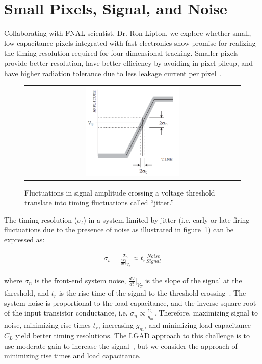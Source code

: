 \section{Small Pixels, Signal, and Noise}
Collaborating with FNAL scientist, Dr. Ron Lipton, we explore whether small, low-capacitance pixels integrated with fast electronics show promise for realizing the timing resolution required for four-dimensional tracking.
Smaller pixels provide better resolution, have better efficiency by avoiding in-pixel pileup, and have higher radiation tolerance due to less leakage current per pixel~\cite{Garcia-Sciveres_2018}.

\begin{figure}[htb]
  \begin{center}
    \begin{tabular}{c}
        \includegraphics[width=0.45\textwidth]{fig_FastTiming/Jitter.png}
    \end{tabular}
    \caption{Fluctuations in signal amplitude crossing a voltage threshold translate into timing fluctuations called ``jitter.''
            }            
    \label{Jitter}
  \end{center}
\end{figure}
The timing resolution ($\sigma_t$) in a system limited by jitter (i.e. early or late firing fluctuations due to the presence of noise as illustrated in figure~\ref{Jitter}) can be expressed as:
\begin{linenomath*}
\begin{align}
\sigma_t =\frac{\sigma_n}{\frac{d V}{d t}\vert_{V_T}} \approx t_r\frac{Noise}{Signal}
\end{align}
\end{linenomath*}
where $\sigma_n$ is the front-end system noise, $\frac{d V}{d t}\vert_{V_T}$ is the slope of the signal at the threshold, and $t_r$ is the rise time of the signal to the threshold crossing~\cite{4336333}.
The system noise is proportional to the load capacitance, and the inverse square root of the input transistor conductance, i.e. $\sigma_n \propto \frac{C_L}{g_m}$.
Therefore, maximizing signal to noise, minimizing rise times $t_r$, increasing $g_m$, and minimizing load capacitance $C_L$ yield better timing resolutions.
The LGAD approach to this challenge is to use moderate gain to increase the signal~\cite{SADROZINSKI2013226}, but we consider the approach of minimizing rise times and load capacitance.

